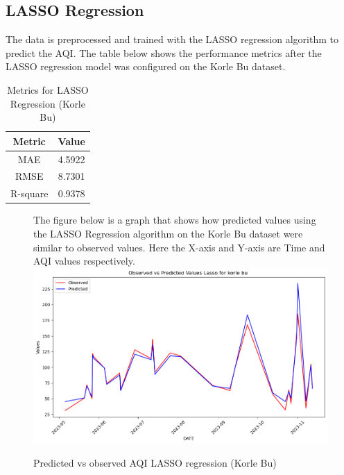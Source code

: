 \documentclass{book}
\numberwithin{equation}{section}
\numberwithin{figure}{section}
\begin{document}
\subsection{LASSO Regression}
The data is preprocessed and trained with the LASSO regression algorithm to predict the AQI. The table below shows the performance metrics after the LASSO regression model was configured on the Korle Bu dataset.
\begin{table}[H]
    \centering
    \begin{tabular}{|c|c|}
        \hline
        \textbf{Metric} & \textbf{Value} \\
        \hline
        MAE & 4.5922 \\
        \hline
        RMSE & 8.7301 \\
        \hline
        R-square & 0.9378 \\
        \hline
    \end{tabular}
    \caption{Metrics for LASSO Regression (Korle Bu)}
    \label{tab: LASSO metrics(Korle Bu)}
\end{table}
\begin{figure}[H]
 \begin{minipage}{\linewidth}
        The figure below is a graph that shows how predicted values using the LASSO Regression algorithm on the Korle Bu dataset were similar to observed values. Here the X-axis and Y-axis are Time and AQI values respectively.
        \vspace{0.5em} 
        \includegraphics[width=\linewidth]{korle bu LASSO.png}
       
        \caption{ Predicted vs observed AQI LASSO regression (Korle Bu)}
        \label{fig: LASSO predicted vs observed AQI(Korle Bu)}
    \end{minipage}
\end{figure}
\end{document}
